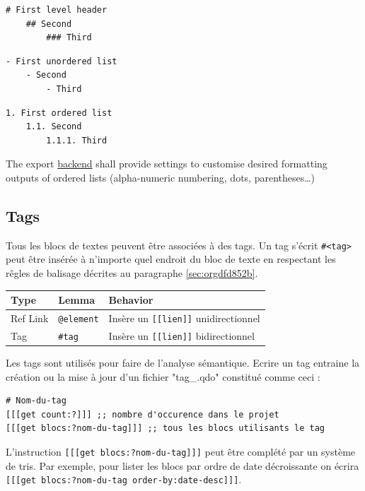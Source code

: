 \documentclass[a4paper,12pt]{article}
\begin{document}
\begin{multicols}{3}
\begin{verbatim}
# First level header
    ## Second    
        ### Third
\end{verbatim}

\begin{verbatim}
- First unordered list
    - Second
        - Third
\end{verbatim}

\begin{verbatim}
1. First ordered list
    1.1. Second
        1.1.1. Third
\end{verbatim}
\end{multicols}

The export \protect\hyperlink{gls-2}{\label{gls-2-use-1}backend} shall provide settings to customise desired formatting outputs of ordered lists (alpha-numeric numbering, dots, parentheses\ldots{}) 
\subsection{Tags}
\label{sec:org15013c8}
Tous les blocs de textes peuvent être associées à des tags.
Un tag s'écrit \texttt{\#<tag>} peut être insérée à n'importe quel endroit du bloc de texte en respectant les rêgles de balisage décrites au paragraphe \ref{sec:orgdfd852b}.

\begin{center}
\begin{tabular}{lll}
\hline
Type & Lemma & Behavior\\
\hline
Ref Link & \texttt{@element} & Insère un \texttt{[[lien]]} unidirectionnel\\
Tag & \texttt{\#tag} & Insère un \texttt{[[lien]]} bidirectionnel\\
\hline
\end{tabular}
\end{center}

Les tags sont utilisés pour faire de l'analyse sémantique. Ecrire un tag entraine la création ou la mise à jour d'un fichier "tag\_<nom-du-tag>.qdo" constitué comme ceci :
\begin{verbatim}
# Nom-du-tag
[[[get count:?]]] ;; nombre d'occurence dans le projet
[[[get blocs:?nom-du-tag]]] ;; tous les blocs utilisants le tag
\end{verbatim}

L'instruction \texttt{[[[get blocs:?nom-du-tag]]]} peut être complété par un système de tris. Par exemple, pour lister les blocs par ordre de date décroissante on écrira \texttt{[[[get blocs:?nom-du-tag order-by:date-desc]]]}.
\end{document}
